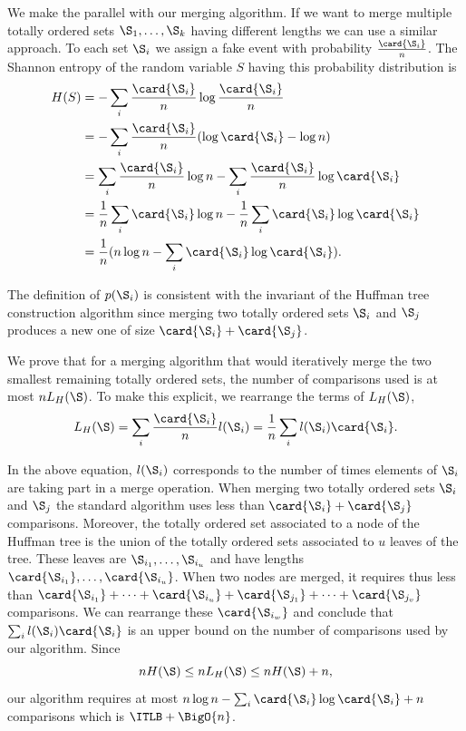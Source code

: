 We make the parallel with our merging algorithm. If we want to merge
multiple totally ordered sets \(\S_1,\ldots,\S_k\) having different lengths we can use a similar
approach. To each set \(\S_i\) we assign a fake event with probability
\(\frac{\card{\S_i}}{n}\). The Shannon entropy of the random variable
\(S\) having this probability distribution is
\begin{align*}
H(S) &= - \sum_i \frac{\card{\S_i}}{n} \log \frac{\card{\S_i}}{n}\\
&= - \sum_i \frac{\card{\S_i}}{n} (\log \card{\S_i} - \log n)\\
&= \sum_i \frac{\card{\S_i}}{n} \log n - \sum_i \frac{\card{\S_i}}{n} \log \card{\S_i}\\
&= \frac{1}{n} \sum_i \card{\S_i} \log n - \frac{1}{n} \sum_i \card{\S_i} \log
\card{\S_i}\\
&= \frac{1}{n} (n \log n - \sum_i \card{\S_i} \log \card{\S_i}).
\end{align*}

The definition of \(p(\S_i)\) is consistent with the invariant of
the Huffman tree construction algorithm since merging two totally ordered sets
\(\S_i\) and \(\S_j\) produces a new one of size \(\card{\S_i} + \card{\S_j}\).

We prove that for a merging algorithm that would iteratively merge the two
smallest remaining totally ordered sets, the number of comparisons used is at
most \(n L_H(\S)\). To make this explicit, we rearrange the terms of \(L_H(\S)\),
\begin{displaymath}
L_H(\S) = \sum_i \frac{\card{\S_i}}{n} l(\S_i) = \frac{1}{n} \sum_i l(\S_i) \card{\S_i}.
\end{displaymath}

In the above equation, \(l(\S_i)\) corresponds to the number of times elements
of \(\S_i\) are taking part in a merge operation. When merging two totally
ordered sets \(\S_i\) and \(\S_j\) the standard \tapemerge algorithm uses less
than \(\card{\S_i} + \card{\S_j}\) comparisons. Moreover, the totally ordered set
associated to a node of the Huffman tree is the union of the totally ordered
sets associated to \(u\) leaves of the tree. These leaves are
\(\S_{i_1},\ldots,\S_{i_u}\) and have lengths
\(\card{\S_{i_1}},\ldots,\card{\S_{i_u}}\). When two nodes are merged, it
requires thus less than
\(\card{\S_{i_1}}+\cdots+\card{\S_{i_u}}+\card{\S_{j_1}}+\cdots+\card{\S_{j_v}}\)
comparisons. We can rearrange these \(\card{\S_{i_w}}\) and conclude that
\(\sum_i l(\S_i) \card{\S_i}\) is an upper bound on the number of comparisons used
by our algorithm. Since
\begin{displaymath}
n H(\S) \le n L_H(\S) \le n H(\S) + n,
\end{displaymath}
our algorithm requires at most \(n \log n - \sum_i \card{\S_i} \log \card{\S_i} +
n\) comparisons which is \(\ITLB + \BigO{n}\).


